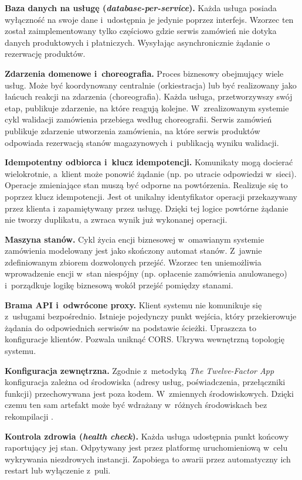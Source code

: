 \textbf{Baza danych na usługę (\emph{database-per-service}).} Każda usługa posiada wyłączność na swoje dane
i~udostępnia je jedynie poprzez interfejs. Wzorzec ten został zaimplementowany tylko częściowo gdzie 
serwis zamówień nie dotyka danych produktowych i płatniczych. Wysyłając asynchronicznie żądanie o rezerwację
produktów.

\textbf{Zdarzenia domenowe i~choreografia.} Proces biznesowy obejmujący wiele usług. Może być koordynowany
centralnie (orkiestracja) lub być realizowany jako łańcuch reakcji na zdarzenia (choreografia). Każda usługa,
przetworzywszy swój etap, publikuje zdarzenie, na które reagują kolejne. W~zrealizowanym systemie cykl walidacji
zamówienia przebiega według choreografii. Serwis zamówień publikuje zdarzenie utworzenia zamówienia, na które
serwis produktów odpowiada rezerwacją stanów magazynowych i~publikacją wyniku walidacji.

\textbf{Idempotentny odbiorca i~klucz idempotencji.} Komunikaty mogą docierać wielokrotnie, a~klient może
ponowić żądanie (np. po utracie odpowiedzi w~sieci). Operacje zmieniające stan muszą być odporne na powtórzenia.
Realizuje się to poprzez klucz idempotencji. Jest ot unikalny identyfikator operacji przekazywany przez klienta i zapamiętywany przez usługę.
Dzięki tej logice powtórne żądanie nie tworzy duplikatu, a zwraca wynik już wykonanej operacji.


\textbf{Maszyna stanów.} Cykl życia encji biznesowej w~omawianym systemie zamówienia modelowany jest jako
skończony automat stanów. Z~jawnie zdefiniowanym zbiorem dozwolonych przejść. Wzorzec ten uniemożliwia wprowadzenie
encji w~stan niespójny (np. opłacenie zamówienia anulowanego) i~porządkuje logikę biznesową wokół przejść pomiędzy
stanami.

\textbf{Brama API i~odwrócone proxy.} Klient systemu nie komunikuje się z~usługami bezpośrednio. Istnieje pojedynczy 
punkt wejścia, który przekierowuje żądania do odpowiednich serwisów na podstawie ścieżki. Upraszcza to konfiguracje 
klientów. Pozwala uniknąć CORS. Ukrywa wewnętrzną topologię systemu.

\textbf{Konfiguracja zewnętrzna.} Zgodnie z~metodyką \emph{The Twelve-Factor App} konfiguracja zależna od środowiska
(adresy usług, poświadczenia, przełączniki funkcji) przechowywana jest poza kodem. W~zmiennych środowiskowych.
Dzięki czemu ten sam artefakt może być wdrażany w~różnych środowiskach bez rekompilacji \parencite{twelvefactor}.

\textbf{Kontrola zdrowia (\emph{health check}).} Każda usługa udostępnia punkt końcowy raportujący jej stan.
Odpytywany jest przez platformę uruchomieniową w~celu wykrywania niezdrowych instancji. Zapobiega to awarii
przez automatyczny ich restart lub wyłączenie z~puli.

